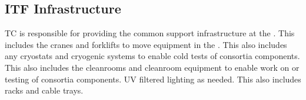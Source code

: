 \subsection{ITF Infrastructure}

TC is responsible for providing the common support infrastructure at
the . This includes the cranes and forklifts to move
equipment in the . This also includes any cryostats and
cryogenic systems to enable cold tests of consortia components. This
also includes the cleanrooms and cleanroom equipment to enable work on
or testing of consortia components. UV filtered lighting as
needed. This also includes racks and cable trays.
